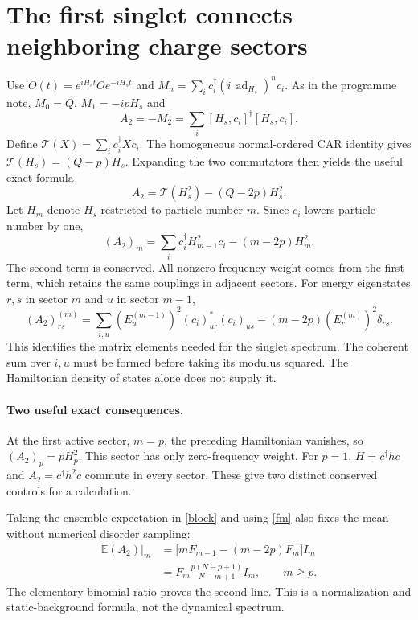 \documentclass[11pt,a4paper]{article}
\newcommand{\E}{\mathbb E}
\begin{document}
\newpage
\section{The first singlet connects neighboring charge sectors}
Use $O(t)=e^{iH_st}Oe^{-iH_st}$ and
$M_n=\sum_i c_i^\dagger(i\,\operatorname{ad}_{H_s})^n c_i$.
As in the programme note, $M_0=Q$, $M_1=-ipH_s$ and
\begin{equation}
 A_2=-M_2=\sum_i[H_s,c_i]^\dagger[H_s,c_i].
\end{equation}
Define $\mathcal T(X)=\sum_i c_i^\dagger Xc_i$. The homogeneous
normal-ordered CAR identity gives $\mathcal T(H_s)=(Q-p)H_s$.
Expanding the two commutators then yields the useful exact formula
\begin{equation}
 \boxed{A_2=\mathcal T(H_s^2)-(Q-2p)H_s^2.}\label{a2}
\end{equation}
Let $H_m$ denote $H_s$ restricted to particle number $m$. Since $c_i$
lowers particle number by one,
\begin{equation}
 (A_2)_m=\sum_i c_i^\dagger H_{m-1}^2c_i-(m-2p)H_m^2.\label{block}
\end{equation}
The second term is conserved. All nonzero-frequency weight comes from
the first term, which retains the same couplings in adjacent sectors.
For energy eigenstates $r,s$ in sector $m$ and $u$ in sector $m-1$,
\begin{equation}
 (A_2)^{(m)}_{rs}=
 \sum_{i,u}(E_u^{(m-1)})^2(c_i)_{ur}^*(c_i)_{us}
 -(m-2p)(E_r^{(m)})^2\delta_{rs}.\label{matrix}
\end{equation}
This identifies the matrix elements needed for the singlet spectrum.
The coherent sum over $i,u$ must be formed before taking its modulus
squared. The Hamiltonian density of states alone does not supply it.

\paragraph{Two useful exact consequences.}
At the first active sector, $m=p$, the preceding Hamiltonian vanishes,
so $(A_2)_p=pH_p^2$. This sector has only zero-frequency weight.
For $p=1$, $H=c^\dagger h c$ and $A_2=c^\dagger h^2c$ commute in every
sector. These give two distinct conserved controls for a calculation.

Taking the ensemble expectation in \eqref{block} and using \eqref{fm}
also fixes the mean without numerical disorder sampling:
\begin{align}
 \E(A_2)|_m
 &=\big[mF_{m-1}-(m-2p)F_m\big]I_m\nonumber\\
 &=F_m\frac{p(N-p+1)}{N-m+1}I_m,\qquad m\ge p.\label{amean}
\end{align}
The elementary binomial ratio proves the second line. This is a
normalization and static-background formula, not the dynamical spectrum.
\end{document}
